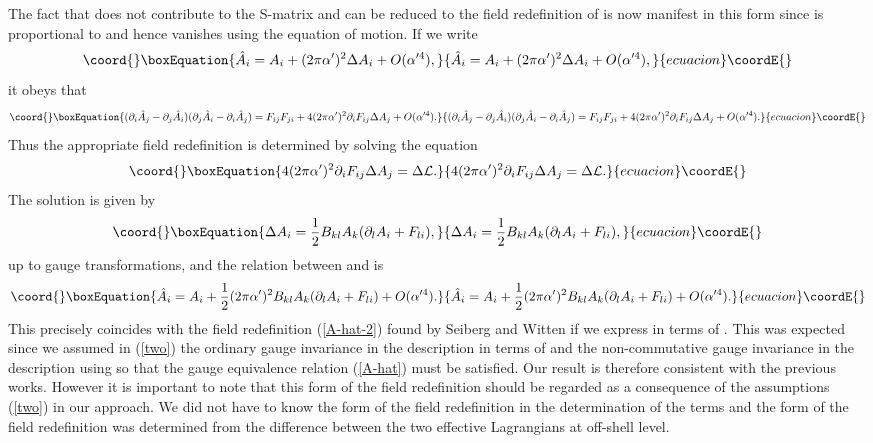 \documentclass[a4paper,12pt]{article}
\begin{document}
The fact that \coordHE{} does not contribute
to the S-matrix and can be reduced to the field redefinition
of \coordHE{} is now manifest in this form
since \coordHE{} is proportional to \coordHE{}
and hence vanishes using the equation of motion.
If we write
\begin{equation}\coord{}\boxEquation{
\hat{A}_i = A_i + (2 \pi \alpha')^2 \Delta A_i + O(\alpha'^4),
}{
\hat{A}_i = A_i + (2 \pi \alpha')^2 \Delta A_i + O(\alpha'^4),
}{ecuacion}\coordE{}\end{equation}
it obeys that
\begin{equation}\coord{}\boxEquation{
(\partial_i \hat{A}_j - \partial_j \hat{A}_i)
(\partial_j \hat{A}_i - \partial_i \hat{A}_j)
= F_{ij} F_{ji}
+ 4 (2 \pi \alpha')^2 \partial_i F_{ij} \Delta A_j
+ O(\alpha'^4).
}{
(\partial_i \hat{A}_j - \partial_j \hat{A}_i)
(\partial_j \hat{A}_i - \partial_i \hat{A}_j)
= F_{ij} F_{ji}
+ 4 (2 \pi \alpha')^2 \partial_i F_{ij} \Delta A_j
+ O(\alpha'^4).
}{ecuacion}\coordE{}\end{equation}
Thus the appropriate field redefinition is determined by
solving the equation
\begin{equation}\coord{}\boxEquation{
4 (2 \pi \alpha')^2 \partial_i F_{ij} \Delta A_j
= \Delta {\cal L}.
}{
4 (2 \pi \alpha')^2 \partial_i F_{ij} \Delta A_j
= \Delta {\cal L}.
}{ecuacion}\coordE{}\end{equation}
The solution is given by
\begin{equation}\coord{}\boxEquation{
\Delta A_i = \frac{1}{2} B_{kl} A_k (\partial_l A_i + F_{li}),
}{
\Delta A_i = \frac{1}{2} B_{kl} A_k (\partial_l A_i + F_{li}),
}{ecuacion}\coordE{}\end{equation}
up to gauge transformations,
and the relation between \coordHE{} and \coordHE{} is
\begin{equation}\coord{}\boxEquation{
\hat{A}_i = A_i + \frac{1}{2} (2 \pi \alpha')^2
B_{kl} A_k (\partial_l A_i + F_{li})
+ O(\alpha'^4).
\label{redefinition-1}
}{
\hat{A}_i = A_i + \frac{1}{2} (2 \pi \alpha')^2
B_{kl} A_k (\partial_l A_i + F_{li})
+ O(\alpha'^4).
}{ecuacion}\coordE{}\end{equation}
This precisely coincides with the field redefinition
(\ref{A-hat-2}) found by Seiberg and Witten \cite{SW}
if we express \myHighlight{$\theta$}\coordHE{} in terms of \coordHE{}.
This was expected
since we assumed in (\ref{two})
the ordinary gauge invariance
in the description in terms of \coordHE{} and
the non-commutative gauge invariance
in the description using \coordHE{}
so that the gauge equivalence relation (\ref{A-hat})
must be satisfied.
Our result is therefore consistent with the previous works.
However it is important to note that
this form of the field redefinition should be regarded as
a consequence of the assumptions (\ref{two}) in our approach.
We did not have to know the form of the field redefinition
in the determination of the \coordHE{} terms
and the form of the field redefinition was determined from
the difference between the two effective Lagrangians
at off-shell level.
\end{document}
